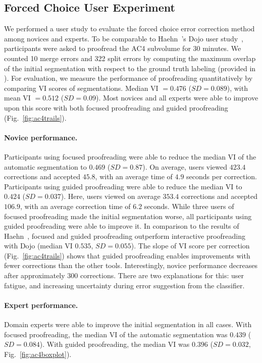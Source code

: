 \subsection{Forced Choice User Experiment}
We performed a user study to evaluate the forced choice error correction method among novices and experts. To be comparable to Haehn~\etal's Dojo user study~\cite{haehn_dojo_2014}, participants were asked to proofread the AC4 subvolume for 30 minutes. We counted 10 merge errors and 322 split errors by computing the maximum overlap of the initial segmentation with respect to the ground truth labeling (provided in \cite{haehn_dojo_2014}). For evaluation, we measure the performance of proofreading quantitatively by comparing VI scores of segmentations. Median VI $=0.476$ ($SD=0.089$), with mean VI $=0.512$ ($SD=0.09$). Most novices and all experts were able to improve upon this score with both focused proofreading and guided proofreading (Fig.~\ref{fig:ac4trails}).

\paragraph{Novice performance.} Participants using focused proofreading were able to reduce the median VI of the automatic segmentation to $0.469$ ($SD=0.87$). On average, users viewed $423.4$ corrections and accepted $45.8$, with an average time of $4.9$ seconds per correction. Participants using guided proofreading were able to reduce the median VI to $0.424$ ($SD=0.037$). Here, users viewed on average $353.4$ corrections and accepted $106.9$, with an average correction time of $6.2$ seconds. While three users of focused proofreading made the initial segmentation worse, all participants using guided proofreading were able to improve it. In comparison to the results of Haehn~\etal, focused and guided proofreading outperform interactive proofreading with Dojo (median VI $0.535$, $SD=0.055$). The slope of VI score per correction (Fig.~\ref{fig:ac4trails}) shows that guided proofreading enables improvements with fewer corrections than the other tools. Interestingly, novice performance decreases after approximately $300$ corrections. There are two explanations for this: user fatigue, and increasing uncertainty during error suggestion from the classifier. %

\paragraph{Expert performance.} Domain experts were able to improve the initial segmentation in all cases. With focused proofreading, the median VI of the automatic segmentation was $0.439$ ($SD=0.084$). With guided proofreading, the median VI was $0.396$ ($SD=0.032$, Fig.~\ref{fig:ac4boxplot}).

